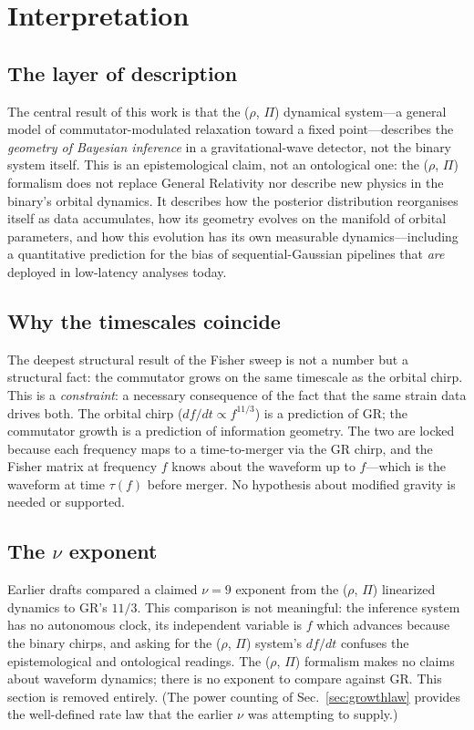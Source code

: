 \documentclass[twocolumn,prd,showpacs,superscriptaddress]{revtex4-2}
\newcommand{\secref}[1]{Sec.~\ref{sec:#1}}
\begin{document}
\section{Interpretation}
\label{sec:interpretation}

\subsection{The layer of description}

The central result of this work is that the ($\rho$, $\Pi$) dynamical
system---a general model of commutator-modulated relaxation toward a
fixed point---describes the \emph{geometry of Bayesian inference} in a
gravitational-wave detector, not the binary system itself.  This is an
epistemological claim, not an ontological one: the ($\rho$, $\Pi$)
formalism does not replace General Relativity nor describe new physics
in the binary's orbital dynamics.  It describes how the posterior
distribution reorganises itself as data accumulates, how its geometry
evolves on the manifold of orbital parameters, and how this evolution
has its own measurable dynamics---including a quantitative prediction
for the bias of sequential-Gaussian pipelines that \emph{are} deployed
in low-latency analyses today.

\subsection{Why the timescales coincide}

The deepest structural result of the Fisher sweep is not a number but a
structural fact: the commutator grows on the same timescale as the
orbital chirp.  This is a \emph{constraint}: a necessary consequence of
the fact that the same strain data drives both.  The orbital chirp
($df/dt \propto f^{11/3}$) is a prediction of GR; the commutator growth
is a prediction of information geometry.  The two are locked because
each frequency maps to a time-to-merger via the GR chirp, and the
Fisher matrix at frequency $f$ knows about the waveform up to
$f$---which is the waveform at time $\tau(f)$ before merger.  No
hypothesis about modified gravity is needed or supported.

\subsection{The $\nu$ exponent}

Earlier drafts compared a claimed $\nu = 9$ exponent from the
($\rho$, $\Pi$) linearized dynamics to GR's $11/3$.  This comparison
is not meaningful: the inference system has no autonomous clock, its
independent variable is $f$ which advances because the binary chirps,
and asking for the ($\rho$, $\Pi$) system's $df/dt$ confuses the
epistemological and ontological readings.  The ($\rho$, $\Pi$) formalism
makes no claims about waveform dynamics; there is no exponent to
compare against GR.  This section is removed entirely.  (The power
counting of \secref{growthlaw} provides the well-defined rate law that
the earlier $\nu$ was attempting to supply.)
\end{document}
